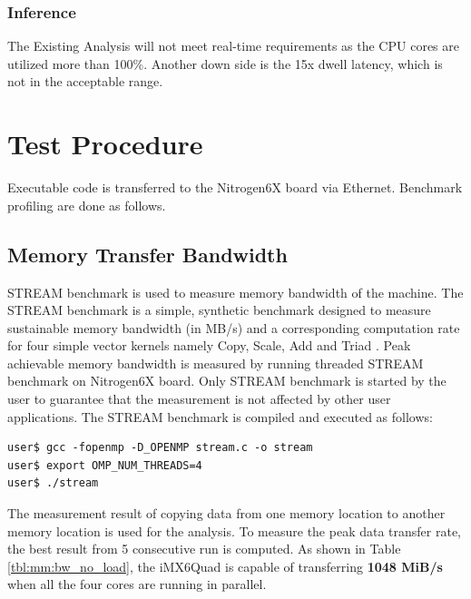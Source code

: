 \subsubsection{Inference}
The Existing Analysis will not meet real-time requirements as the CPU cores are utilized more than 100\%. Another down side is the 15x dwell latency, which is not in the acceptable range.

\clearpage
\section{Test Procedure} 
\label{sec:mm:test_procedure}
Executable code is transferred to the Nitrogen6X board via Ethernet. Benchmark profiling are done as follows.

\subsection{Memory Transfer Bandwidth}
\label{ss:mm:mem_bw}
STREAM benchmark\cite{McCalpin2007} is used to measure memory bandwidth of the machine. The STREAM benchmark is a simple, synthetic benchmark designed to measure sustainable memory bandwidth (in MB/s) and a corresponding computation rate for four simple vector kernels namely Copy, Scale, Add and Triad \cite{streamDef}. Peak achievable memory bandwidth is measured by running threaded STREAM benchmark on Nitrogen6X board. Only STREAM benchmark is started by the user to guarantee that the measurement is not affected by other user applications.  The STREAM benchmark is compiled and executed as follows: \\


\begin{lstlisting}
user$ gcc -fopenmp -D_OPENMP stream.c -o stream
user$ export OMP_NUM_THREADS=4
user$ ./stream
\end{lstlisting}

The measurement result of copying data from one memory location to another memory location is used for the  analysis. To measure the peak data transfer rate, the best result from 5 consecutive run is computed. As shown in Table \ref{tbl:mm:bw_no_load}, the iMX6Quad is capable of transferring \textbf{1048 MiB/s} when all the four cores are running in parallel.\\

